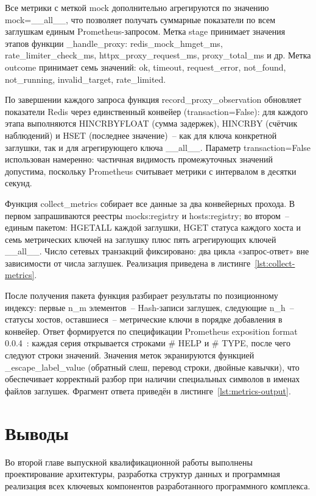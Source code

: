 Все метрики с меткой mock дополнительно агрегируются по значению mock=\textquotedbl\_\_all\_\_\textquotedbl, что позволяет получать суммарные показатели по всем заглушкам единым Prometheus-запросом. Метка stage принимает значения этапов функции \_handle\_proxy: redis\_mock\_hmget\_ms, rate\_limiter\_check\_ms, httpx\_proxy\_request\_ms, proxy\_total\_ms и др. Метка outcome принимает семь значений: ok, timeout, request\_error, not\_found, not\_running, invalid\_target, rate\_limited.


По завершении каждого запроса функция record\_proxy\_observation обновляет показатели Redis через единственный конвейер (transaction=False): для каждого этапа выполняются HINCRBYFLOAT (сумма задержек), HINCRBY (счётчик наблюдений) и HSET (последнее значение)~-- как для ключа конкретной заглушки, так и для агрегирующего ключа \_\_all\_\_. Параметр transaction=False использован намеренно: частичная видимость промежуточных значений допустима, поскольку Prometheus считывает метрики с интервалом в десятки секунд.

Функция collect\_metrics собирает все данные за два конвейерных прохода. В первом запрашиваются реестры mocks:registry и hosts:registry; во втором~-- единым пакетом: HGETALL каждой заглушки, HGET статуса каждого хоста и семь метрических ключей на заглушку плюс пять агрегирующих ключей \_\_all\_\_. Число сетевых транзакций фиксировано: два цикла «запрос-ответ» вне зависимости от числа заглушек. Реализация приведена в листинге~\ref{lst:collect-metrics}.


После получения пакета функция разбирает результаты по позиционному индексу: первые n\_m элементов~-- Hash-записи заглушек, следующие n\_h~-- статусы хостов, оставшиеся~-- метрические ключи в порядке добавления в конвейер. Ответ формируется по спецификации Prometheus exposition format 0.0.4~\cite{prometheus-exposition}: каждая серия открывается строками \# HELP и \# TYPE, после чего следуют строки значений. Значения меток экранируются функцией \_escape\_label\_value (обратный слеш, перевод строки, двойные кавычки), что обеспечивает корректный разбор при наличии специальных символов в именах файлов заглушек. Фрагмент ответа приведён в листинге~\ref{lst:metrics-output}.



\section{Выводы}
Во второй главе выпускной квалификационной работы выполнены проектирование архитектуры, разработка структур данных и программная реализация всех ключевых компонентов разработанного программного комплекса.

